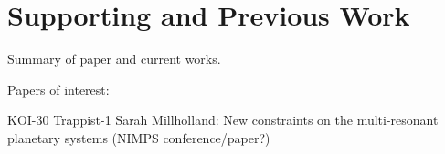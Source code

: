 \section{Supporting and Previous Work}
Summary of paper and current works.

Papers of interest:

KOI-30
Trappist-1
Sarah Millholland: New constraints on the multi-resonant planetary systems (NIMPS conference/paper?)
